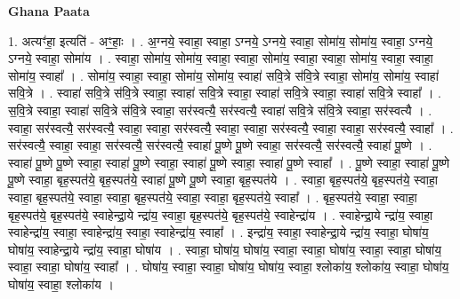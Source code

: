 \documentclass[17pt]{extarticle}
\begin{document}
\textbf{Ghana Paata } \newline

1. अत्यꣳ॑हा॒ इत्यति॑ - अꣳ॒॒हाः॒ । . अ॒ग्नये॒ स्वाहा॒ स्वाहा॒ ऽग्नये॒ ऽग्नये॒ स्वाहा॒ सोमा॑य॒ सोमा॑य॒ स्वाहा॒ ऽग्नये॒ ऽग्नये॒ स्वाहा॒ सोमा॑य । . स्वाहा॒ सोमा॑य॒ सोमा॑य॒ स्वाहा॒ स्वाहा॒ सोमा॑य॒ स्वाहा॒ स्वाहा॒ सोमा॑य॒ स्वाहा॒ स्वाहा॒ सोमा॑य॒ स्वाहा᳚ । . सोमा॑य॒ स्वाहा॒ स्वाहा॒ सोमा॑य॒ सोमा॑य॒ स्वाहा॑ सवि॒त्रे स॑वि॒त्रे स्वाहा॒ सोमा॑य॒ सोमा॑य॒ स्वाहा॑ सवि॒त्रे । . स्वाहा॑ सवि॒त्रे स॑वि॒त्रे स्वाहा॒ स्वाहा॑ सवि॒त्रे स्वाहा॒ स्वाहा॑ सवि॒त्रे स्वाहा॒ स्वाहा॑ सवि॒त्रे स्वाहा᳚ । . स॒वि॒त्रे स्वाहा॒ स्वाहा॑ सवि॒त्रे स॑वि॒त्रे स्वाहा॒ सर॑स्वत्यै॒ सर॑स्वत्यै॒ स्वाहा॑ सवि॒त्रे स॑वि॒त्रे स्वाहा॒ सर॑स्वत्यै । . स्वाहा॒ सर॑स्वत्यै॒ सर॑स्वत्यै॒ स्वाहा॒ स्वाहा॒ सर॑स्वत्यै॒ स्वाहा॒ स्वाहा॒ सर॑स्वत्यै॒ स्वाहा॒ स्वाहा॒ सर॑स्वत्यै॒ स्वाहा᳚ । . सर॑स्वत्यै॒ स्वाहा॒ स्वाहा॒ सर॑स्वत्यै॒ सर॑स्वत्यै॒ स्वाहा॑ पू॒ष्णे पू॒ष्णे स्वाहा॒ सर॑स्वत्यै॒ सर॑स्वत्यै॒ स्वाहा॑ पू॒ष्णे । . स्वाहा॑ पू॒ष्णे पू॒ष्णे स्वाहा॒ स्वाहा॑ पू॒ष्णे स्वाहा॒ स्वाहा॑ पू॒ष्णे स्वाहा॒ स्वाहा॑ पू॒ष्णे स्वाहा᳚ । . पू॒ष्णे स्वाहा॒ स्वाहा॑ पू॒ष्णे पू॒ष्णे स्वाहा॒ बृह॒स्पत॑ये॒ बृह॒स्पत॑ये॒ स्वाहा॑ पू॒ष्णे पू॒ष्णे स्वाहा॒ बृह॒स्पत॑ये । . स्वाहा॒ बृह॒स्पत॑ये॒ बृह॒स्पत॑ये॒ स्वाहा॒ स्वाहा॒ बृह॒स्पत॑ये॒ स्वाहा॒ स्वाहा॒ बृह॒स्पत॑ये॒ स्वाहा॒ स्वाहा॒ बृह॒स्पत॑ये॒ स्वाहा᳚ । . बृह॒स्पत॑ये॒ स्वाहा॒ स्वाहा॒ बृह॒स्पत॑ये॒ बृह॒स्पत॑ये॒ स्वाहेन्द्रा॒ये न्द्रा॑य॒ स्वाहा॒ बृह॒स्पत॑ये॒ बृह॒स्पत॑ये॒ स्वाहेन्द्रा॑य । . स्वाहेन्द्रा॒ये न्द्रा॑य॒ स्वाहा॒ स्वाहेन्द्रा॑य॒ स्वाहा॒ स्वाहेन्द्रा॑य॒ स्वाहा॒ स्वाहेन्द्रा॑य॒ स्वाहा᳚ । . इन्द्रा॑य॒ स्वाहा॒ स्वाहेन्द्रा॒ये न्द्रा॑य॒ स्वाहा॒ घोषा॑य॒ घोषा॑य॒ स्वाहेन्द्रा॒ये न्द्रा॑य॒ स्वाहा॒ घोषा॑य । . स्वाहा॒ घोषा॑य॒ घोषा॑य॒ स्वाहा॒ स्वाहा॒ घोषा॑य॒ स्वाहा॒ स्वाहा॒ घोषा॑य॒ स्वाहा॒ स्वाहा॒ घोषा॑य॒ स्वाहा᳚ । . घोषा॑य॒ स्वाहा॒ स्वाहा॒ घोषा॑य॒ घोषा॑य॒ स्वाहा॒ श्लोका॑य॒ श्लोका॑य॒ स्वाहा॒ घोषा॑य॒ घोषा॑य॒ स्वाहा॒ श्लोका॑य । \newline
\end{document}
